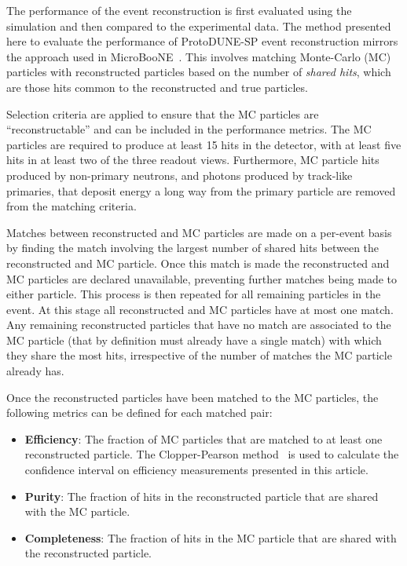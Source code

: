 \documentclass[epjc3]{svjour3}
\begin{document}
The performance of the event reconstruction is first evaluated using the simulation and then compared to the experimental data. The method presented here to evaluate the performance of ProtoDUNE-SP event reconstruction mirrors the approach used in MicroBooNE~\cite{pandorauboone}. This involves matching Monte-Carlo (MC) particles with reconstructed particles based on the number of \textit{shared hits}, which are those hits common to the reconstructed and true particles.
 
Selection criteria are applied to ensure that the MC particles are ``reconstructable'' and can be included in the performance metrics. The MC particles are required to produce at least 15 hits in the detector, with at least five hits in at least two of the three readout views. Furthermore, MC particle hits produced by non-primary neutrons, and photons produced by track-like primaries, that deposit energy a long way from the primary particle are removed from the matching criteria.

Matches between reconstructed and MC particles are made on a per-event basis by finding the match involving the largest number of shared hits between the reconstructed and MC particle. Once this match is made the reconstructed and MC particles are declared unavailable, preventing further matches being made to either particle. This process is then repeated for all remaining particles in the event. At this stage all reconstructed and MC particles have at most one match. Any remaining reconstructed particles that have no match are associated to the MC particle (that by definition must already have a single match) with which they share the most hits, irrespective of the number of matches the MC particle already has.

Once the reconstructed particles have been matched to the MC particles, the following metrics can be defined for each matched pair:
\begin{itemize}
\item \textbf{Efficiency}: The fraction of MC particles that are matched to at least one reconstructed particle. The Clopper-Pearson method~\cite{clopperPearson} is used to calculate the confidence interval on efficiency measurements presented in this article.
\item \textbf{Purity}: The fraction of hits in the reconstructed particle that are shared with the MC particle.
\item \textbf{Completeness}: The fraction of hits in the MC particle that are shared with the reconstructed particle.
\end{itemize}
\end{document}
